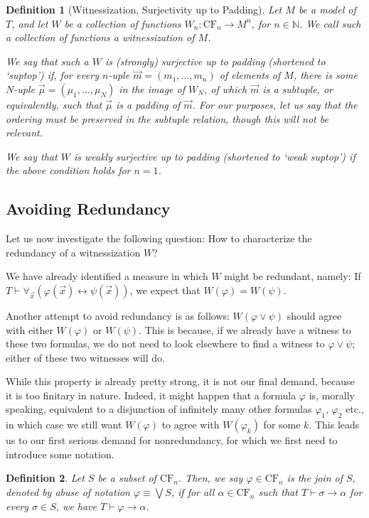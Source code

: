 \documentclass{article}
\newtheorem{definition}{Definition}
\theoremstyle{nonumberplain}
\newcommand{\N}{\mathbb{N}}
\newcommand{\CF}{\mathrm{CF}}
\begin{document}
\begin{definition}[Witnessization, Surjectivity up to Padding]
Let $M$ be a model of $T$, and let $W$ be a collection of functions $W_n \colon \CF_n \to M^n$, for $n \in \N$. We call such a collection of functions a \emph{witnessization of $M$}.

We say that such a $W$ is \emph{(strongly) surjective up to padding} (shortened to `suptop') if, for every $n$-uple $\vec m = (m_1, \dots, m_n)$ of elements of $M$, there is some $N$-uple $\vec\mu = (\mu_1, \dots, \mu_N)$ in the image of $W_N$, of which $\vec m$ is a subtuple, or equivalently, such that $\vec\mu$ is a padding of $\vec m$. For our purposes, let us say that the ordering must be preserved in the subtuple relation, though this will not be relevant.

We say that $W$ is \emph{weakly surjective up to padding} (shortened to `weak suptop') if the above condition holds for $n = 1$.
\end{definition}

\subsection{Avoiding Redundancy}

Let us now investigate the following question: How to characterize the redundancy of a witnessization $W$?

We have already identified a measure in which $W$ might be redundant, namely: If $T \vdash \forall_{\vec x}  (\varphi(\vec x) \leftrightarrow \psi(\vec x))$, we expect that $W(\varphi) = W(\psi)$.

Another attempt to avoid redundancy is as follows: $W(\varphi \lor \psi)$ should agree with either $W(\varphi)$ or $W(\psi)$. This is because, if we already have a witness to these two formulas, we do not need to look elsewhere to find a witness to $\varphi \lor \psi$; either of these two witnesses will do.

While this property is already pretty strong, it is not our final demand, because it is too finitary in nature. Indeed, it might happen that a formula $\varphi$ is, morally speaking, equivalent to a disjunction of infinitely many other formulas $\varphi_1$, $\varphi_2$ etc., in which case we still want $W(\varphi)$ to agree with $W(\varphi_k)$ for some $k$. This leads us to our first serious demand for nonredundancy, for which we first need to introduce some notation.
\begin{definition}
Let $S$ be a subset of $\CF_n$. Then, we say $\varphi \in \CF_n$ is the join of $S$, denoted by abuse of notation $\varphi \equiv \bigvee S$, if for all $\alpha \in \CF_n$ such that $T \vdash \sigma \rightarrow \alpha$ for every $\sigma \in S$, we have $T \vdash \varphi \rightarrow \alpha$.
\end{definition}
\end{document}

